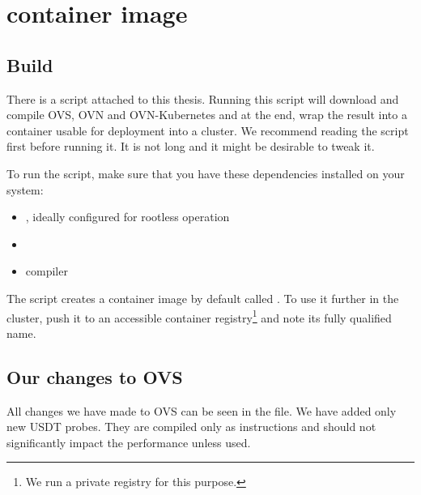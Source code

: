 \chapter{ container image}
\label{chap:ovs-mod}

\section{Build}

There is a script  attached to this thesis. Running this script will download and compile OVS, OVN and OVN-Kubernetes and at the end, wrap the result into a container usable for deployment into a cluster. We recommend reading the script first before running it. It is not long and it might be desirable to tweak it.

To run the script, make sure that you have these dependencies installed on your system:

\begin{itemize}
    \item {}, ideally configured for rootless operation
    \item {}
    \item {} compiler
\end{itemize}

The script creates a container image by default called . To use it further in the cluster, push it to an accessible container registry\footnote{We run a private registry for this purpose.} and note its fully qualified name.

\section{Our changes to OVS}

All changes we have made to OVS can be seen in the  file. We have added only new USDT probes. They are compiled only as  instructions and should not significantly impact the performance unless used.
